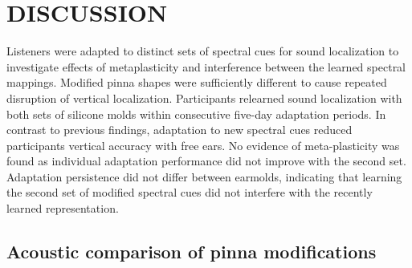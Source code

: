\section{DISCUSSION}\label{sec1}%

Listeners were adapted to distinct sets of spectral cues for sound localization to investigate effects of metaplasticity and interference between the learned spectral mappings. Modified pinna shapes were sufficiently different to cause repeated disruption of vertical localization. Participants relearned sound localization with both sets of silicone molds within consecutive five-day adaptation periods. In contrast to previous findings, adaptation to new spectral cues reduced participants vertical accuracy with free ears. No evidence of meta-plasticity was found as individual adaptation performance did not improve with the second set. Adaptation persistence did not differ between earmolds, indicating that learning the second set of modified spectral cues did not interfere with the recently learned representation.

\subsection{Acoustic comparison of pinna modifications}

